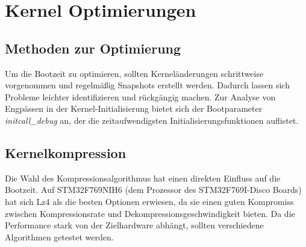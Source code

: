 
\section{Kernel Optimierungen}

\subsection{Methoden zur Optimierung}
Um die Bootzeit zu optimieren, sollten Kerneländerungen schrittweise vorgenommen und regelmäßig Snapshots
erstellt werden. Dadurch lassen sich Probleme leichter identifizieren und rückgängig machen. Zur Analyse von
Engpässen in der Kernel-Initialisierung bietet sich der Bootparameter \textit{initcall\_debug} an, der die
zeitaufwendigsten Initialisierungsfunktionen auflistet.

\subsection{Kernelkompression}
Die Wahl des Kompressionsalgorithmus hat einen direkten Einfluss auf die Bootzeit. Auf STM32F769NIH6 (dem
Prozessor des STM32F769I-Disco Boards) hat sich Lz4 als die besten Optionen erwiesen, da sie einen guten
Kompromiss zwischen Kompressionsrate und Dekompressionsgeschwindigkeit bieten. Da die Performance stark von
der Zielhardware abhängt, sollten verschiedene Algorithmen getestet werden.

